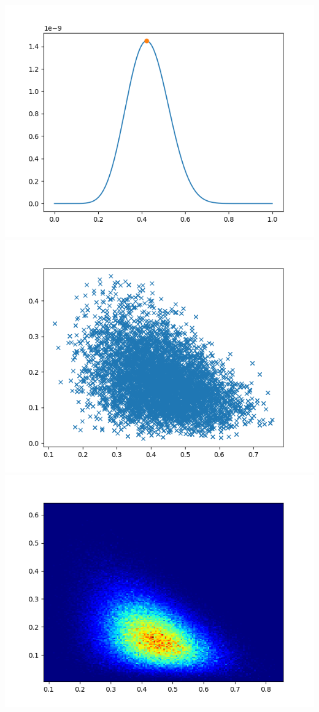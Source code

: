 \documentclass[pt12]{article}
\begin{document}
\newpage

\begin{center}
\includegraphics[scale=0.5]{hip32.png}\\
\includegraphics[scale=0.5]{sc32.png}\\
\includegraphics[scale=0.5]{den32.png}\\
\end{center}
\end{document}
